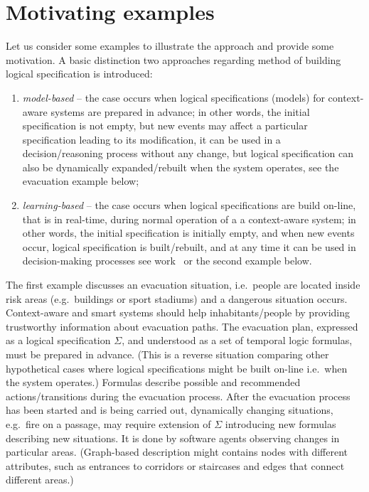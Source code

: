 \documentclass[runningheads,a4paper]{llncs}
\begin{document}
\section{Motivating examples}
\label{sec:examples}

Let us consider some examples to illustrate the approach and provide some motivation.
A basic distinction two approaches regarding method of building logical specification is introduced:
\begin{enumerate}
  \item \emph{model-based} -- the case occurs when logical specifications (models) for context-aware systems are prepared in advance;
                                    in other words, the initial specification is not empty,
                                    but new events may affect a particular specification leading to its modification,
                                    it can be used in a decision/reasoning process without any change,
                                    but logical specification can also be dynamically expanded/rebuilt when the system operates,
                                    see the evacuation example below;
  \item \emph{learning-based} -- the case occurs when logical specifications are build on-line, that is in real-time,
                                    during normal operation of a a context-aware system;
                                    in other words, the initial specification is initially empty,
                                    and when new events occur, logical specification is built/rebuilt,
                                    and at any time it can be used in decision-making processes
                                    see work~\cite{Klimek-Kotulski-2014-IE-AITAmI} or the second example below.
\end{enumerate}

The first example discusses an evacuation situation,
i.e.\ people are located inside risk areas (e.g.\ buildings or sport stadiums)
and a dangerous situation occurs.
Context-aware and smart systems should help inhabitants/people by providing trustworthy information about evacuation paths.
The evacuation plan,
expressed as a logical specification $\Sigma$,
and understood as a set of temporal logic formulas,
must be prepared in advance.
(This is a reverse situation comparing other hypothetical cases where logical specifications might be built on-line
i.e.\ when the system operates.)
Formulas describe possible and recommended actions/transitions during the evacuation process.
After the evacuation process has been started and is being carried out,
dynamically changing situations, e.g.\ fire on a passage,
may require extension of $\Sigma$ introducing new formulas describing new situations.
It is done by software agents observing changes in particular areas.
(Graph-based description might contains nodes with different attributes,
such as entrances to corridors or staircases and edges that connect different areas.)
\end{document}
